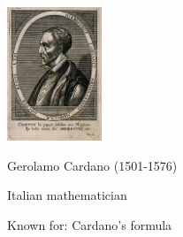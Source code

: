 \begin{frame}
	\hfil\hfil \includegraphics[height=4cm]{../../modules/history/pictures/cardano.jpg}
	
	\hfil\hfil Gerolamo Cardano (1501-1576)
	
	\hfil\hfil Italian mathematician
	
	\hfil\hfil Known for: Cardano's formula
	
	
\end{frame}



